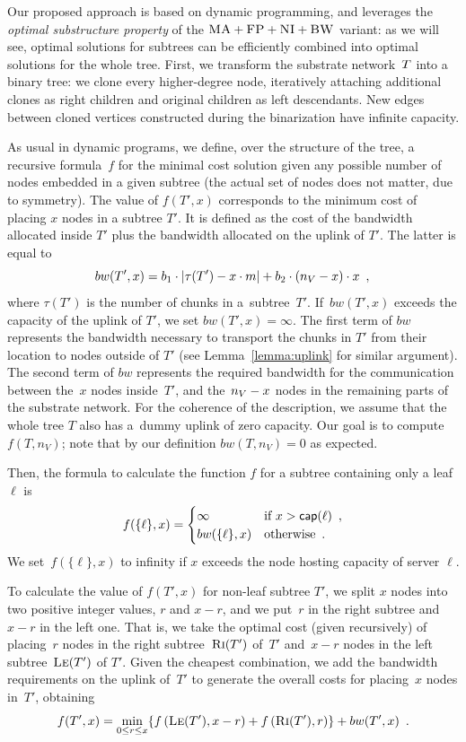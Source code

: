  Our proposed approach is based on dynamic programming, and
leverages the \emph{optimal substructure property} of the $\textsc{MA}+\textsc{FP}+\textsc{NI}+\textsc{BW}$ variant:
as we will see, optimal solutions for subtrees
can be efficiently combined into optimal solutions for the whole tree.
First, we transform the
substrate network~$T$
into a binary tree:
we clone every higher-degree node,
iteratively attaching additional clones as right children
and original children as left descendants.
New edges between cloned vertices constructed during the binarization have infinite capacity.

As usual in dynamic programs, we define, over the structure of the tree, a
recursive formula~$f$ for
the minimal cost solution given any possible number of nodes
embedded in a given subtree (the actual set of nodes does not matter,
due to symmetry).
The value of $f(T', x)$ corresponds to the minimum cost of placing $x$ nodes in a subtree $T'$.
It is defined as the cost of the bandwidth allocated inside $T'$ plus the bandwidth allocated on the uplink of $T'$.
The latter is equal to
\[
bw(T',x) = 
    b_1\cdot|\tau(T')-x\cdot m| +b_2 \cdot
(n_V - x) \cdot x\enspace, \\
  \]
  where $\tau(T')$ is the number of chunks in a~subtree~$T'$.
  If~$bw(T',x)$ exceeds the capacity of the uplink of $T'$, we set $bw(T', x) = \infty$.
  The first term of $bw$ represents
the bandwidth necessary to transport the chunks in $T'$ from their location to
nodes outside of $T'$ (see Lemma~\ref{lemma:uplink} for similar argument).
The second term of $bw$ represents the required bandwidth for the communication between the~$x$
nodes inside~$T'$, and the~$n_V - x$ nodes in the remaining parts of the substrate
network.
For the coherence of the description, we assume that the whole tree $T$ also has a~dummy uplink of zero capacity.
Our goal is to compute $f(T, n_V)$; note that by our definition $bw(T, n_V) = 0$ as expected.

Then, the formula to calculate the function $f$ for a subtree containing only a leaf $\ell$ is
\[
f(\{ \ell \}, x) =
\begin{cases}
   \infty & \mbox{if } x > \textsf{cap}(\ell)\enspace,\\
    bw(\{ \ell \}, x) & \mbox{otherwise}\enspace. \\
  \end{cases}
  \]
We set~$f(\{ \ell \},x)$ to infinity if $x$ exceeds the node hosting capacity of server $\ell$.

To calculate the value of $f(T', x)$ for non-leaf subtree $T'$, we split $x$ nodes
into two positive integer
values, $r$ and $x-r$, and we put~$r$ in the right subtree and~$x - r$ in the left one.
That is, we take the optimal cost
(given recursively) of placing~$r$ nodes in
the right subtree~$\textsc{Ri}(T')$ of~$T'$ and~$x-r$ nodes in the left subtree~$\textsc{Le}(T')$ of
$T'$. Given the cheapest combination, we add the bandwidth requirements
on the uplink of~$T'$ to generate the overall costs for placing~$x$ nodes in~$T'$, obtaining
\[
  f(T', x) = 
    \min_{0\leq r \leq x} \{  f\left(\textsc{Le}(T'),
x-r\right) +
f\left(\textsc{Ri}(T'), r\right) \} + bw(T',x)\enspace.
  \]

